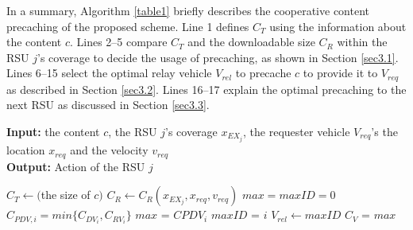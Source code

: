\documentclass[electronics,aricle,accept,pdftex,moreauthors]{Definitions/mdpi}
\begin{document}
In a summary, Algorithm \ref{table1} briefly describes the cooperative content precaching of the proposed scheme.
Line 1 defines $C_{T}$ using the information about the content $c$.
Lines 2--5 compare $C_{T}$ and the downloadable size $C_{R}$ within the RSU $j$'s coverage to decide the usage of precaching, as shown in Section \ref{sec3.1}.
Lines 6--15 select the optimal relay vehicle $V_{rel}$ to precache $c$ to provide it to $V_{req}$ as described in Section \ref{sec3.2}.
Lines 16--17 explain the optimal precaching to the next RSU as discussed in Section \ref{sec3.3}.

\begin{algorithm}[H]

    \caption{Cooperative Content Precaching} \label{table1}
    \textbf{Input: } the content $c$, the RSU $j$'s coverage $x_{EX_{j}}$, the requester vehicle $V_{req}$'s the location $x_{req}$ and the velocity $v_{req}$\\
    \textbf{Output: } Action of the RSU $j$
    \begin{algorithmic}[1]
        \State $C_{T} \leftarrow ($the size of $c)$
        \State $C_{R} \leftarrow C_{R}(x_{EX_{j}}, x_{req}, v_{req})$
        \Else
            \State $max = maxID = 0$
                \State $C_{PDV, i} = min\{C_{DV_{i}}, C_{RV_{i}}\}$
                    \State $max$ = $C{PDV_{i}}$
                    \State $maxID$ = $i$
                \EndIf
                \State $V_{rel} \leftarrow maxID$
                \State $C_{V}$ = $max$
                \EndIf
            \EndFor
        \EndIf
    \end{algorithmic}
\end{algorithm}
\end{document}
